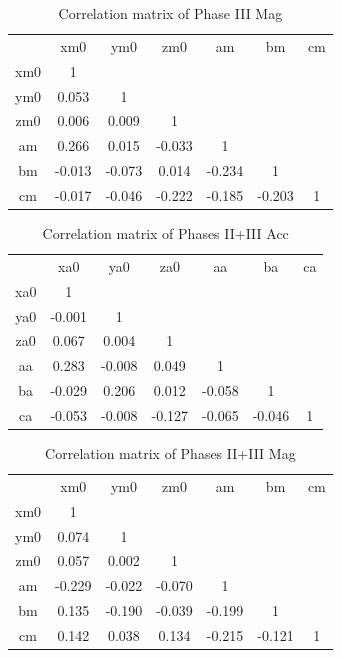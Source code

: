 \begin{table}[H]
    \centering
    \begin{tabular}{c|c|c|c|c|c|c}
             &   xm0  & ym0    &   zm0  &   am   &   bm   & cm \\
         xm0 &  1     &        &        &        &        &    \\
         ym0 &  0.053 &  1     &        &        &        &    \\
         zm0 &  0.006 &  0.009 &  1     &        &        &    \\
         am  &  0.266 &  0.015 & -0.033 &  1     &        &    \\
         bm  & -0.013 & -0.073 &  0.014 & -0.234 &  1     &    \\
         cm  & -0.017 & -0.046 & -0.222 & -0.185 & -0.203 & 1  \\
    \end{tabular}
    \caption{Correlation matrix of Phase III Mag}
\end{table}

\begin{table}[H]
    \centering
    \begin{tabular}{c|c|c|c|c|c|c}
             &   xa0  &   ya0  &   za0  &   aa   &   ba   & ca \\
         xa0 &  1     &        &        &        &        &    \\
         ya0 & -0.001 &  1     &        &        &        &    \\
         za0 &  0.067 &  0.004 &  1     &        &        &    \\
         aa  &  0.283 & -0.008 &  0.049 &  1     &        &    \\
         ba  & -0.029 &  0.206 &  0.012 & -0.058 &  1     &    \\
         ca  & -0.053 & -0.008 & -0.127 & -0.065 & -0.046 &  1 \\
    \end{tabular}
    \caption{Correlation matrix of Phases II+III Acc}
\end{table}

\begin{table}[H]
    \centering
    \begin{tabular}{c|c|c|c|c|c|c}
             &   xm0  & ym0    &   zm0  &   am   &   bm   & cm \\
         xm0 &  1     &        &        &        &        &    \\
         ym0 &  0.074 &  1     &        &        &        &    \\
         zm0 &  0.057 &  0.002 &  1     &        &        &    \\
         am  & -0.229 & -0.022 & -0.070 &  1     &        &    \\
         bm  &  0.135 & -0.190 & -0.039 & -0.199 &  1     &    \\
         cm  &  0.142 &  0.038 &  0.134 & -0.215 & -0.121 & 1  \\
    \end{tabular}
    \caption{Correlation matrix of Phases II+III Mag}
\end{table}


